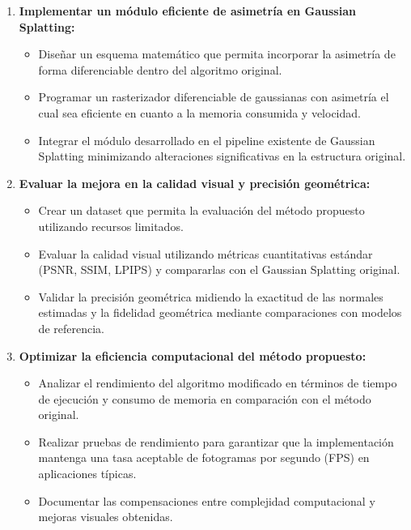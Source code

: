 \begin{enumerate}
\item \textbf{Implementar un módulo eficiente de asimetría en Gaussian Splatting:}
\begin{itemize}
    \item Diseñar un esquema matemático que permita incorporar la asimetría de forma diferenciable dentro del algoritmo original.
    \item Programar un rasterizador diferenciable de gaussianas con asimetría el cual sea eficiente en cuanto a la memoria consumida y velocidad.
    \item Integrar el módulo desarrollado en el pipeline existente de Gaussian Splatting minimizando alteraciones significativas
     en la estructura original.
\end{itemize}

\item \textbf{Evaluar la mejora en la calidad visual y precisión geométrica:}
\begin{itemize}
    \item Crear un dataset que permita la evaluación del método propuesto utilizando recursos limitados.
    \item Evaluar la calidad visual utilizando métricas cuantitativas estándar (PSNR, SSIM, LPIPS) y compararlas con el Gaussian Splatting original.
    \item Validar la precisión geométrica midiendo la exactitud de las normales estimadas y la fidelidad geométrica mediante comparaciones con modelos de referencia.
\end{itemize}

\item \textbf{Optimizar la eficiencia computacional del método propuesto:}
\begin{itemize}
    \item Analizar el rendimiento del algoritmo modificado en términos de tiempo de ejecución y consumo de memoria en comparación con el método original.
    \item Realizar pruebas de rendimiento para garantizar que la implementación mantenga una tasa aceptable de fotogramas por segundo (FPS) en aplicaciones típicas.
    \item Documentar las compensaciones entre complejidad computacional y mejoras visuales obtenidas.
\end{itemize}


\end{enumerate}
